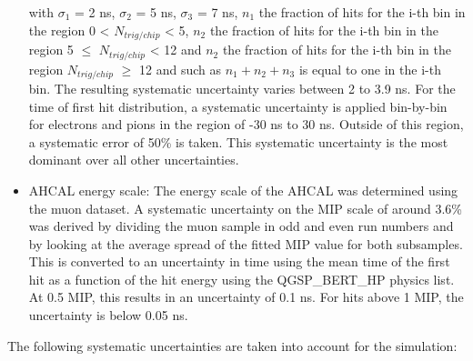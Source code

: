\documentclass{JINST}
\begin{document}
\begin{itemize}
  with $\sigma_1$ = 2 ns, $\sigma_2$ = 5 ns, $\sigma_3$ = 7 ns, $n_1$ the fraction of hits for the i-th bin in the region 0 < $N_{trig/chip}$ < 5, $n_2$ the fraction of hits for the i-th bin in the region 5 $\leq$ $N_{trig/chip}$ < 12 and $n_2$ the fraction of hits for the i-th bin in the region $N_{trig/chip}$ $\geq$ 12 and such as $n_1 + n_2 + n_3$ is equal to one in the i-th bin. The resulting systematic uncertainty varies between 2 to 3.9 ns. For the time of first hit distribution, a systematic uncertainty is applied bin-by-bin for electrons and pions in the region of -30 ns to 30 ns. Outside of this region, a systematic error of 50\% is taken. This systematic uncertainty is the most dominant over all other uncertainties.
  \item AHCAL energy scale: The energy scale of the AHCAL was determined using the muon dataset. A systematic uncertainty on the MIP scale of around 3.6\% was derived by dividing the muon sample in odd and even run numbers and by looking at the average spread of the fitted MIP value for both subsamples. This is converted to an uncertainty in time using the mean time of the first hit as a function of the hit energy using the QGSP\_BERT\_HP physics list. At 0.5 MIP, this results in an uncertainty of 0.1 ns. For hits above 1 MIP, the uncertainty is below 0.05 ns.
\end{itemize}
The following systematic uncertainties are taken into account for the simulation:
\end{document}
